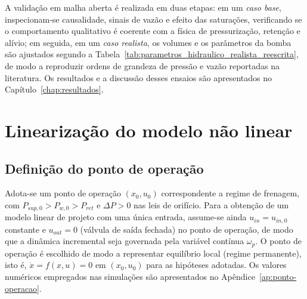 A validação em malha aberta é realizada em duas etapas: em um \emph{caso base}, inspecionam-se causalidade, sinais de vazão e efeito das saturações, verificando se o comportamento qualitativo é coerente com a física de pressurização, retenção e alívio; em seguida, em um \emph{caso realista}, os volumes e os parâmetros da bomba são ajustados segundo a Tabela~\ref{tab:parametros_hidraulico_realista_reescrita}, de modo a reproduzir ordens de grandeza de pressão e vazão reportadas na literatura. Os resultados e a discussão desses ensaios são apresentados no Capítulo~\ref{chap:resultados}.



















\section{Linearização do modelo não linear}
\label{sec:controle-linearizacao-2p}



\subsection{Definição do ponto de operação}
\label{sec:definicao-ponto-operacao}
Adota-se um ponto de operação $(x_0,u_0)$ correspondente a regime de frenagem, com $P_{sup,0}>P_{w,0}>P_{ret}$ e $\Delta P>0$ nas leis de orifício. Para a obtenção de um modelo linear de projeto com uma única entrada, assume-se ainda $u_{in}=u_{in,0}$ constante e $u_{out}=0$ (válvula de saída fechada) no ponto de operação, de modo que a dinâmica incremental seja governada pela variável contínua $\omega_p$. O ponto de operação é escolhido de modo a representar equilíbrio local (regime permanente), isto é, $\dot{x}=f(x,u)=0$ em $(x_0,u_0)$ para as hipóteses adotadas. Os valores numéricos empregados nas simulações são apresentados no Apêndice~\ref{ap:ponto-operacao}.
